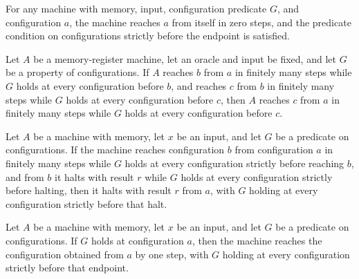 \begin{lemma}
\label{Complexity.LogProg.MReach.refl}
\leanok
{}
For any machine with memory, input, configuration predicate $G$, and configuration $a$,
the machine reaches $a$ from itself in zero steps, and the predicate condition on
configurations strictly before the endpoint is satisfied.
\end{lemma}

\begin{lemma}
\label{Complexity.LogProg.MReach.trans}
\leanok
{}
Let $A$ be a memory-register machine, let an oracle and input be fixed, and let $G$ be a
property of configurations. If $A$ reaches $b$ from $a$ in finitely many steps while $G$
holds at every configuration before $b$, and reaches $c$ from $b$ in finitely many steps
while $G$ holds at every configuration before $c$, then $A$ reaches $c$ from $a$ in
finitely many steps while $G$ holds at every configuration before $c$.
\end{lemma}

\begin{lemma}
\label{Complexity.LogProg.MReach.halt}
\leanok
{}
Let $A$ be a machine with memory, let $x$ be an input, and let $G$ be a predicate on
configurations. If the machine reaches configuration $b$ from configuration $a$ in
finitely many steps while $G$ holds at every configuration strictly before reaching $b$,
and from $b$ it halts with result $r$ while $G$ holds at every configuration strictly
before halting, then it halts with result $r$ from $a$, with $G$ holding at every
configuration strictly before that halt.
\end{lemma}

\begin{lemma}
\label{Complexity.LogProg.MReach.single}
\leanok
{}
Let $A$ be a machine with memory, let $x$ be an input, and let $G$ be a predicate on
configurations. If $G$ holds at configuration $a$, then the machine reaches the
configuration obtained from $a$ by one step, with $G$ holding at every configuration
strictly before that endpoint.
\end{lemma}

